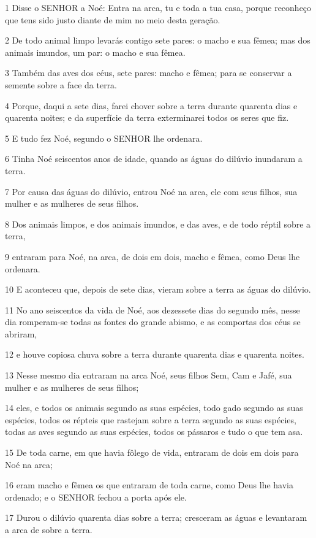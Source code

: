 \par 1 Disse o SENHOR a Noé: Entra na arca, tu e toda a tua casa, porque reconheço que tens sido justo diante de mim no meio desta geração.
\par 2 De todo animal limpo levarás contigo sete pares: o macho e sua fêmea; mas dos animais imundos, um par: o macho e sua fêmea.
\par 3 Também das aves dos céus, sete pares: macho e fêmea; para se conservar a semente sobre a face da terra.
\par 4 Porque, daqui a sete dias, farei chover sobre a terra durante quarenta dias e quarenta noites; e da superfície da terra exterminarei todos os seres que fiz.
\par 5 E tudo fez Noé, segundo o SENHOR lhe ordenara.
\par 6 Tinha Noé seiscentos anos de idade, quando as águas do dilúvio inundaram a terra.
\par 7 Por causa das águas do dilúvio, entrou Noé na arca, ele com seus filhos, sua mulher e as mulheres de seus filhos.
\par 8 Dos animais limpos, e dos animais imundos, e das aves, e de todo réptil sobre a terra,
\par 9 entraram para Noé, na arca, de dois em dois, macho e fêmea, como Deus lhe ordenara.
\par 10 E aconteceu que, depois de sete dias, vieram sobre a terra as águas do dilúvio.
\par 11 No ano seiscentos da vida de Noé, aos dezessete dias do segundo mês, nesse dia romperam-se todas as fontes do grande abismo, e as comportas dos céus se abriram,
\par 12 e houve copiosa chuva sobre a terra durante quarenta dias e quarenta noites.
\par 13 Nesse mesmo dia entraram na arca Noé, seus filhos Sem, Cam e Jafé, sua mulher e as mulheres de seus filhos;
\par 14 eles, e todos os animais segundo as suas espécies, todo gado segundo as suas espécies, todos os répteis que rastejam sobre a terra segundo as suas espécies, todas as aves segundo as suas espécies, todos os pássaros e tudo o que tem asa.
\par 15 De toda carne, em que havia fôlego de vida, entraram de dois em dois para Noé na arca;
\par 16 eram macho e fêmea os que entraram de toda carne, como Deus lhe havia ordenado; e o SENHOR fechou a porta após ele.
\par 17 Durou o dilúvio quarenta dias sobre a terra; cresceram as águas e levantaram a arca de sobre a terra.
